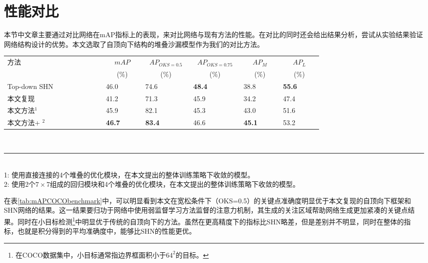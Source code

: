 \section{性能对比}
\label{sec:perfcompare}
本节中文章主要通过对比网络在mAP指标上的表现，来对比网络与现有方法的性能。在对比的同时还会给出结果分析，尝试从实验结果验证网络结构设计的优势。本文选取了自顶向下结构的堆叠沙漏模型作为我们的对比方法。
\begin{table*}[ht]
	\centering
	\caption{COCO公开测试集的模型性能对比}
	\label{tab:mAPCOCObenchmark}
	\begin{minipage}[t]{0.8\linewidth}
		\begin{tabular}{p{0.25\linewidth}p{0.1\linewidth}<{\centering}p{0.1\linewidth}<{\centering}p{0.1\linewidth}<{\centering}p{0.1\linewidth}<{\centering}p{0.1\linewidth}<{\centering}}
			\hline
			方法 & \multicolumn{1}{c}{$mAP$} & \multicolumn{1}{c}{$AP_{OKS=0.5}$} & \multicolumn{1}{c}{$AP_{OKS=0.75}$}
			& \multicolumn{1}{c}{$AP_M$} & \multicolumn{1}{c}{$AP_L$} \\
			
			& \multicolumn{1}{c}{(\%)}& \multicolumn{1}{c}{(\%)}&
			\multicolumn{1}{c}{(\%)}& \multicolumn{1}{c}{(\%)}& \multicolumn{1}{c}{
				(\%)}\\
			\hline
			Top-down SHN\cite{newell2016stacked} & 46.0 & 74.6 & \textbf{48.4} & 38.8  & \textbf{55.6} \\
			本文复现 & 41.2 & 71.3 & 45.9 & 34.2 & 47.4 \\
			本文方法$^1$ & 45.9 & 82.1 & 45.3 & 43.0 & 51.6 \\
			本文方法+ $^2$ & \textbf{46.7} & \textbf{83.4} & 46.6 & \textbf{45.1} & 53.2 \\
			\hline
		\end{tabular}\\[2pt]
		\noindent\rule{0.25\linewidth}{1pt} \\
		\footnotesize
		1: 使用直接连接的4个堆叠的优化模块，在本文提出的整体训练策略下收敛的模型。\\
		2: 使用2个$7\times7$组成的回归模块和4个堆叠的优化模块，在本文提出的整体训练策略下收敛的模型。
	\end{minipage}
\end{table*}

在表\ref{tab:mAPCOCObenchmark}中，可以明显看到本文在宽松条件下（OKS=0.5）的关键点准确度明显优于本文复现的自顶向下框架和SHN网络的结果。这一结果要归功于网络中使用弱监督学习方法监督的注意力机制，其生成的关注区域帮助网络生成更加紧凑的关键点结果。同时在小目标检测\footnote{在COCO数据集中，小目标通常指边界框面积小于$64^2$的目标。}中明显优于传统的自顶向下的方法。虽然在更高精度下的指标比SHN略差，但是差别并不明显，同时在整体的指标，也就是积分得到的平均准确度中，能够比SHN的性能更优。

